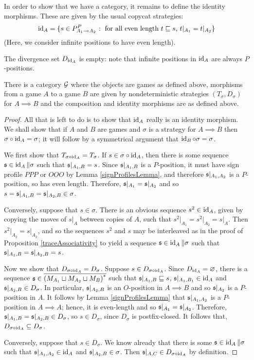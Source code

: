 \documentclass{entcs} \usepackage{prentcsmacro}
\newcommand{\0}{{\mathtt{0}}}
\begin{document}
In order to show that we have a category, it remains to define the identity morphisms.  These are given by the usual copycat strategies:
\[
  \operatorname{id}_A = \{s\in P_{A_1\multimap A_2}^P\;\colon\;\textrm{for all even length $t\sqsubseteq s$, $t\vert_{A_1}=t\vert_{A_2}$}\}
  \]
(Here, we consider infinite positions to have even length).

The divergence set $D_{\operatorname{id}_A}$ is empty: note that infinite positions in $\operatorname{id}_A$ are always $P$-positions.

\begin{theorem}
  There is a category $\mathcal G$ where the objects are games as defined above, morphisms from a game $A$ to a game $B$ are given by nondeterministic strategies $(T_\sigma, D_\sigma)$ for $A\implies B$ and the composition and identity morphisms are as defined above.
\end{theorem}
  \begin{proof}
    All that is left to do is to show that $\operatorname{id}_A$ really is an identity morphism.  We shall show that if $A$ and $B$ are games and $\sigma$ is a strategy for $A\implies B$ then $\sigma \circ \operatorname{id}_A=\sigma$; it will follow by a symmetrical argument that $\operatorname{id}_B \circ \sigma = \sigma$.

    We first show that $T_{\sigma \circ \operatorname{id}_A}=T_\sigma$.  If $s\in\sigma \circ \operatorname{id}_A$, then there is some sequence $\mathfrak s\in\operatorname{id}_A\|\sigma$ such that $\mathfrak s\vert_{A_1,B}=s$.  Since $\mathfrak s\vert_{A_1,B}$ is a $P$-position, it must have sign profile $PPP$ or $OOO$ by Lemma \ref{signProfilesLemma}, and therefore $\mathfrak s\vert_{A_1,A_2}$ is a $P$-position, so has even length.  Therefore, $\mathfrak s\vert_{A_1}=\mathfrak s\vert_{A_2}$ and so $s=\mathfrak s\vert_{A_1,B}=\mathfrak s\vert_{A_2,B}\in\sigma$.

    Conversely, suppose that $s\in\sigma$.  There is an obvious sequence $s^2\in\operatorname{id}_A$, given by copying the moves of $s\vert_A$ between copies of $A$, such that $s^2\vert_{A_1}=s^2\vert_{A_2}=s\vert_A$.  Then $s^2\vert_{A_2}=s\vert_{A_2}$, and so the sequences $s^2$ and $s$ may be interleaved as in the proof of Proposition \ref{traceAssociativity} to yield a sequence $\mathfrak s\in\operatorname{id}_A\|\sigma$ such that $\mathfrak s\vert_{A_1,B}=\mathfrak s\vert_{A_2,B}=s$.  

    Now we show that $D_{\sigma \circ \operatorname{id}_A}=D_\sigma$.  Suppose $s\in D_{\sigma \circ \operatorname{id}_A}$.  Since $D_{\operatorname{id}_A}=\varnothing$, there is a sequence $\mathfrak s\in{\overline{{(M_{A_1}\sqcup M_{A_2}\sqcup M_B)}^{*}}}$ such that $\mathfrak s\vert_{A_1,B}\sqsubseteq s$, $\mathfrak s\vert_{A_1,B_1}\in\operatorname{id}_A$ and $\mathfrak s\vert_{A_2,B}\in D_\sigma$.  In particular, $\mathfrak s\vert_{A_2,B}$ is an $O$-position in $A\implies B$ and so $\mathfrak s\vert_{A_2}$ is a $P$-position in $A$.  It follows by Lemma \ref{signProfilesLemma} that $\mathfrak s\vert_{A_1,A_2}$ is a $P$-position in $A\implies A$; hence, it is even-length and so $\mathfrak s\vert_{A_1}=\mathfrak s\vert_{A_2}$.  Therefore, $\mathfrak s\vert_{A_1,B}=\mathfrak s\vert_{A_2,B}\in D_\sigma$, so $s\in D_\sigma$, since $D_\sigma$ is postfix-closed.  It follows that, $D_{\sigma \circ \operatorname{id}_A}\subseteq D_\sigma$.  

    Conversely, suppose that $s\in D_\sigma$.  We know already that there is some $\mathfrak s\in\operatorname{id}_A\|\sigma$ such that $\mathfrak s\vert_{A_1,A_2}\in\operatorname{id}_A$ and $\mathfrak s\vert_{A_2,B}\in\sigma$.  Then $\mathfrak s\vert_{A,C}\in D_{\sigma \circ \operatorname{id}_A}$ by definition.
  \end{proof}
\end{document}
